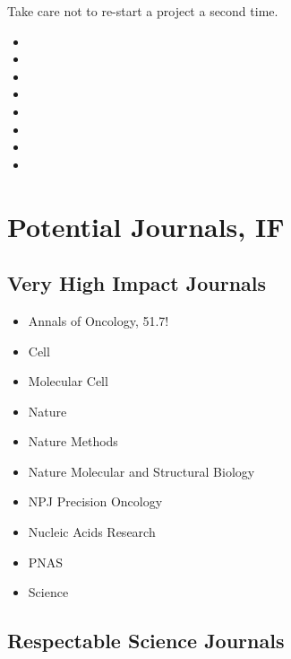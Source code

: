 \documentclass[11pt,letterpaper]{article}
\begin{document}
Take care not to re-start a project a second time.

\begin{itemize}
\item 

\item 

\item 

\item 

\item 

\item 

\item 

\item 
\end{itemize}

\section{Potential Journals, IF}
\label{sec:orgc2fe0b5}

\subsection{Very High Impact Journals}
\label{sec:org4a1ed19}

\begin{itemize}
\item Annals of Oncology, 51.7!
\item Cell
\item Molecular Cell
\item Nature
\item Nature Methods
\item Nature Molecular and Structural Biology
\item NPJ Precision Oncology
\item Nucleic Acids Research
\item PNAS
\item Science
\end{itemize}

\subsection{Respectable Science Journals}
\label{sec:org8da8246}
\end{document}
